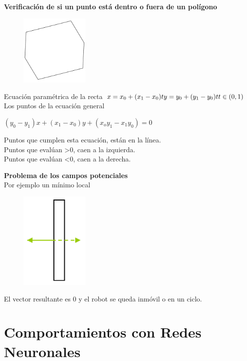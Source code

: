 \textbf{Verificación de si un punto está dentro o fuera de un polígono}

\begin{figure}[h!]
	\centering
	\includegraphics[width=0.3\textwidth]{images/img70.png}
	\label{figura70}
\end{figure}
	\break

Ecuación paramétrica de la recta
$
x = x_0 + (x_1 - x_0)t \\
y = y_0 + (y_1 - y_0)t \\
t \in (0,1)
$
Los puntos de la ecuación general

$
(y_0 - y_1)x + (x_1 - x_0)y + (x_oy_1 - x_1y_0) = 0
$

Puntos que cumplen esta ecuación, están en la línea.
\\ Puntos que evalúan >0, caen a la izquierda. \\ Puntos que evalúan <0, caen a la derecha.

\textbf{Problema de los campos potenciales}
\\ Por ejemplo un mínimo local

\begin{figure}[h!]
	\centering
	\includegraphics[width=0.3\textwidth]{images/img71.png}
	\label{figura71}
\end{figure}
\break


El vector resultante es 0 y el robot se queda inmóvil o en un ciclo.

\section{Comportamientos con Redes Neuronales}


